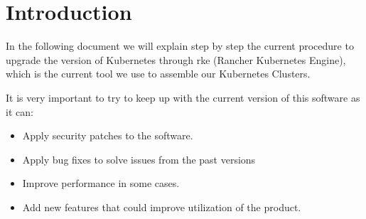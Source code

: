 \section{Introduction}


In the following document we will explain step by step the current procedure to upgrade the version of Kubernetes through rke (Rancher Kubernetes Engine), which is the current tool we use to assemble our Kubernetes Clusters.

It is very important to try to keep up with the current version of this software as it can:
\begin{itemize}
\item
  Apply security patches to the software.
\item
  Apply bug fixes to solve issues from the past versions
\item
  Improve performance in some cases.
\item
  Add new features that could improve utilization of the product.
\end{itemize}
\newpage

